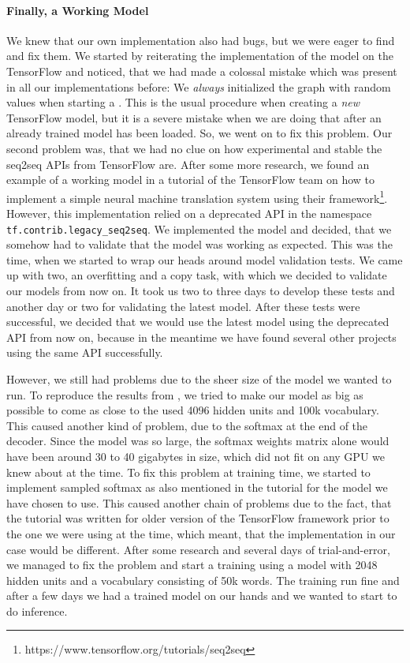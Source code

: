 \paragraph{Finally, a Working Model} We knew that our own implementation also had bugs, but we were eager to find and fix them. We started by reiterating the implementation of the model on the TensorFlow and noticed, that we had made a colossal mistake which was present in all our implementations before: We \emph{always} initialized the graph with random values when starting a . This is the usual procedure when creating a \emph{new} TensorFlow model, but it is a severe mistake when we are doing that after an already trained model has been loaded. So, we went on to fix this problem. Our second problem was, that we had no clue on how experimental and stable the seq2seq APIs from TensorFlow are. After some more research, we found an example of a working model in a tutorial of the TensorFlow team on how to implement a simple neural machine translation system using their framework\footnote{https://www.tensorflow.org/tutorials/seq2seq}. However, this implementation relied on a deprecated API in the namespace \texttt{tf.contrib.legacy\_seq2seq}. We implemented the model and decided, that we somehow had to validate that the model was working as expected. This was the time, when we started to wrap our heads around model validation tests. We came up with two, an overfitting and a copy task, with which we decided to validate our models from now on. It took us two to three days to develop these tests and another day or two for validating the latest model. After these tests were successful, we decided that we would use the latest model using the deprecated API from now on, because in the meantime we have found several other projects using the same API successfully.

However, we still had problems due to the sheer size of the model we wanted to run. To reproduce the results from \cite{Vinyals:2015}, we tried to make our model as big as possible to come as close to the used 4096 hidden units and 100k vocabulary. This caused another kind of problem, due to the softmax at the end of the decoder. Since the model was so large, the softmax weights matrix alone would have been around 30 to 40 gigabytes in size, which did not fit on any GPU we knew about at the time. To fix this problem at training time, we started to implement sampled softmax as also mentioned in the tutorial for the model we have chosen to use. This caused another chain of problems due to the fact, that the tutorial was written for older version of the TensorFlow framework prior to the one we were using at the time, which meant, that the implementation in our case would be different. After some research and several days of trial-and-error, we managed to fix the problem and start a training using a model with 2048 hidden units and a vocabulary consisting of 50k words. The training run fine and after a few days we had a trained model on our hands and we wanted to start to do inference.

